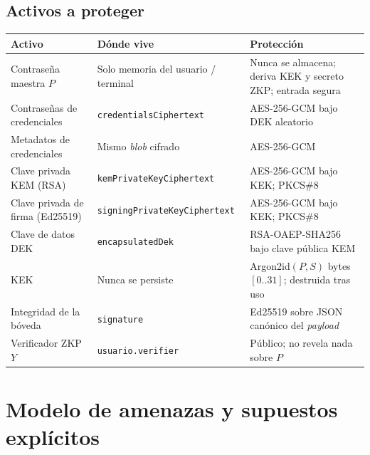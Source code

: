 \documentclass[11pt,a4paper]{article}
\begin{document}
\subsection{Activos a proteger}
\begin{longtable}{@{}p{4.6cm}p{3.4cm}p{6.2cm}@{}}
\toprule
Activo & Dónde vive & Protección \\
\midrule
Contraseña maestra $P$ & Solo memoria del usuario / terminal & Nunca se almacena; deriva KEK y secreto ZKP; entrada segura \\
Contraseñas de credenciales & \texttt{credentialsCiphertext} & AES-256-GCM bajo DEK aleatorio \\
Metadatos de credenciales & Mismo \emph{blob} cifrado & AES-256-GCM \\
Clave privada KEM (RSA) & \texttt{kemPrivateKeyCiphertext} & AES-256-GCM bajo KEK; PKCS\#8 \\
Clave privada de firma (Ed25519) & \texttt{signingPrivateKeyCiphertext} & AES-256-GCM bajo KEK; PKCS\#8 \\
Clave de datos DEK & \texttt{encapsulatedDek} & RSA-OAEP-SHA256 bajo clave pública KEM \\
KEK & Nunca se persiste & Argon2id$(P,S)$ bytes $[0..31]$; destruida tras uso \\
Integridad de la bóveda & \texttt{signature} & Ed25519 sobre JSON canónico del \emph{payload} \\
Verificador ZKP $Y$ & \texttt{usuario.verifier} & Público; no revela nada sobre $P$ \\
\bottomrule
\end{longtable}

\section{Modelo de amenazas y supuestos explícitos}
\end{document}

